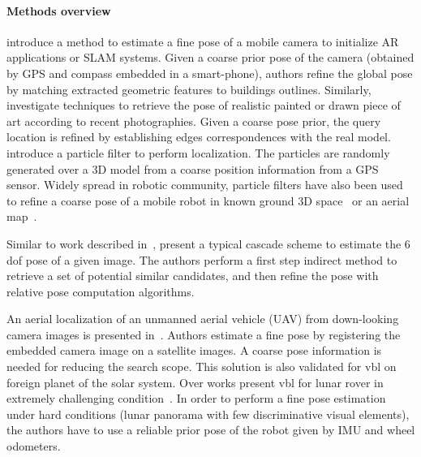 \paragraph{Methods overview}
\citet{Arth2015} introduce a method to estimate a fine pose of a mobile camera to initialize AR applications or SLAM systems. Given a coarse prior pose of the camera (obtained by GPS and compass embedded in a smart-phone), authors refine the global pose by matching extracted geometric features to buildings outlines. Similarly, \citet{Russell2011} investigate techniques to retrieve the pose of realistic painted or drawn piece of art according to recent photographies. Given a coarse pose prior, the query location is refined by establishing edges correspondences with the real model. \citet{Poglitsch2015} introduce a particle filter to perform localization. The particles are randomly generated over a 3D model from a coarse position information from a GPS sensor. Widely spread in robotic community, particle filters have also been used to refine a coarse pose of a mobile robot in known ground 3D space~\citep{Mason2011} or an aerial map~\citep{Christie2016,Brubaker2016}.

Similar to work described in~\citep{Rubio2015,Sattler2017}, \citet{Song2016} present a typical cascade scheme to estimate the 6 \ac{dof} pose of a given image. The authors perform a first step indirect method to retrieve a set of potential similar candidates, and then refine the pose with relative pose computation algorithms. 

An aerial localization of an unmanned aerial vehicle (UAV) from down-looking camera images is presented in~\citep{Wan2016}. Authors estimate a fine pose by registering the embedded camera image on a satellite images. A coarse pose information is needed for reducing the search scope. This solution is also validated for \ac{vbl} on foreign planet of the solar system. Over works present \ac{vbl} for lunar rover in extremely challenging condition~\citep{Wan2014}. In order to perform a fine pose estimation under hard conditions (lunar panorama with few discriminative visual elements), the authors have to use a reliable prior pose of the robot given by IMU and wheel odometers.

